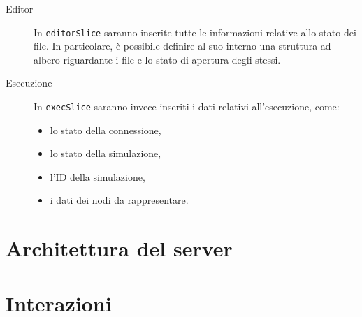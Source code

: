       \begin{description}
        \item[Editor]
          In \texttt{editorSlice} saranno inserite tutte le informazioni relative allo stato dei file.
          In particolare, è possibile definire al suo interno una struttura ad albero riguardante i file e lo stato di apertura degli stessi.
        \item[Esecuzione]
          In \texttt{execSlice} saranno invece inseriti i dati relativi all'esecuzione, come:
          \begin{itemize}
            \item lo stato della connessione,
            \item lo stato della simulazione,
            \item l'ID della simulazione,
            \item i dati dei nodi da rappresentare.
          \end{itemize}
      \end{description}


  \section{Architettura del server}\label{sec:arch:server}

  \section{Interazioni}
